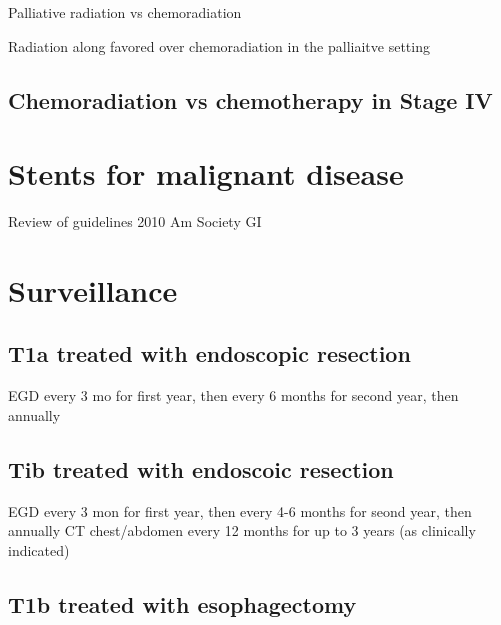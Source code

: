 \documentclass[
]{book}
\begin{document}
Palliative radiation vs chemoradiation \citep{penniment114}

Radiation along favored over chemoradiation in the palliaitve setting \citep{penniment114}

\hypertarget{chemoradiation-vs-chemotherapy-in-stage-iv}{%
\section{Chemoradiation vs chemotherapy in Stage IV}\label{chemoradiation-vs-chemotherapy-in-stage-iv}}

\citep{guttmann1131}

\hypertarget{stents-for-malignant-disease}{%
\chapter{Stents for malignant disease}\label{stents-for-malignant-disease}}

\citep{vakil1791}

Review of guidelines 2010 Am Society GI \citep{sharma258}

\hypertarget{eso_surveillance}{%
\chapter{Surveillance}\label{eso_surveillance}}

\hypertarget{t1a-treated-with-endoscopic-resection}{%
\section{T1a treated with endoscopic resection}\label{t1a-treated-with-endoscopic-resection}}

EGD every 3 mo for first year, then every 6 months for second year, then annually\citep{shaheen30}

\hypertarget{tib-treated-with-endoscoic-resection}{%
\section{Tib treated with endoscoic resection}\label{tib-treated-with-endoscoic-resection}}

EGD every 3 mon for first year, then every 4-6 months for seond year, then annually
CT chest/abdomen every 12 months for up to 3 years (as clinically indicated)

\hypertarget{t1b-treated-with-esophagectomy}{%
\section{T1b treated with esophagectomy}\label{t1b-treated-with-esophagectomy}}
\end{document}
